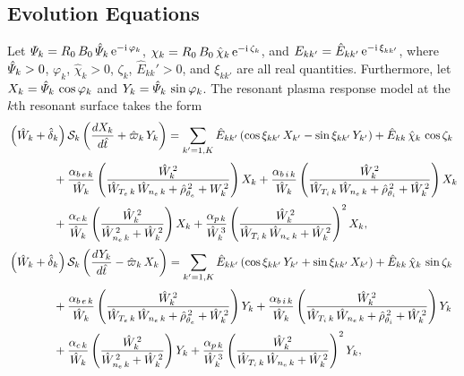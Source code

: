 \documentclass[notitlepage,12pt]{article}
\begin{document}
\subsection{Evolution Equations}
Let ${\mit\Psi}_k= R_0\,B_0\,\hat{\mit\Psi}_k\,{\rm e}^{-{\rm i}\,\varphi_k}$, ${\mit\chi}_k= R_0\,B_0\,\hat{\chi}_k\,{\rm e}^{-{\rm i}\,\zeta_k}$, and $E_{kk'}=\hat{E}_{kk'}\,{\rm e}^{-{\rm i}\,\xi_{kk'}}$,
where $\hat{\mit\Psi}_k>0$, $\varphi_k$, $\hat{\chi}_k>0$, $\zeta_k$, $\hat{E}_{kk}'>0$, and $\xi_{kk'}$ are all real quantities. Furthermore,
let $X_k= \hat{\mit\Psi}_k\,\cos\varphi_k$ and $Y_k= \hat{\mit\Psi}_k\,\sin\varphi_k$. The resonant plasma response model at the 
$k$th resonant surface takes the form
\begin{align}\label{e21}
&\left(\hat{W}_k +\hat{\delta}_k\right){\cal S}_k\left(\frac{dX_k}{d\hat{t}} 
+\hat{\varpi}_k\,Y_k\right)= \sum_{k'=1,K}\hat{E}_{kk'}\,(\cos\xi_{kk'}\,X_{k'}  -\sin\xi_{kk'}\,Y_{k'}) + \hat{E}_{kk}\,\hat{\chi}_k\,\cos\zeta_k\nonumber\\[0.5ex]&\phantom{=====} +\frac{\alpha_{b\,e\,k}}{\hat{W}_k}\left(\frac{\hat{W}_k^{\,2}}{\hat{W}_{T_{e}\,k}\,\hat{W}_{n_e\,k}+\hat{\rho}_{\theta_e}^{\,2}+W_k^{\,2}}\right)X_k+\frac{\alpha_{b\,i\,k}}{\hat{W}_k}\left(\frac{\hat{W}_k^{\,2}}{\hat{W}_{T_{i}\,k}\,\hat{W}_{n_e\,k}+\hat{\rho}_{\theta_i}^{\,2}+\hat{W}_k^{\,2}}\right)X_k\nonumber\\[0.5ex]
&\phantom{=====}+\frac{\alpha_{c\,k}}{\hat{W}_k}\left(\frac{\hat{W}_k^{\,2}}{\hat{W}_{n_e\,k}^{\,2}+\hat{W}_k^{\,2}}\right)X_k+\frac{\alpha_{p\,k}}{\hat{W}_k^{\,3}}\left(\frac{\hat{W}_k^{\,2}}{\hat{W}_{T_{i}\,k}\,\hat{W}_{n_e\,k}+\hat{W}_k^{\,2}}\right)^2 X_k,\\[0.5ex]
&\left(\hat{W}_k +\hat{\delta}_k\right){\cal S}_k\left(\frac{dY_k}{d\hat{t}} -\hat{\varpi}_k\,X_k\right)
= \sum_{k'=1,K}\hat{E}_{kk'}\,(\cos\xi_{kk'}\,Y_{k'}
+\sin\xi_{kk'}\,X_{k'}) + \hat{E}_{kk}\,\hat{\chi}_k\,\sin\zeta_k\nonumber\\[0.5ex]&\phantom{=====} +\frac{\alpha_{b\,e\,k}}{\hat{W}_k}\left(\frac{\hat{W}_k^{\,2}}{\hat{W}_{T_{e}\,k}\,\hat{W}_{n_e\,k}+\hat{\rho}_{\theta_e}^{\,2}+\hat{W}_k^{\,2}}\right)Y_k+\frac{\alpha_{b\,i\,k}}{\hat{W}_k}\left(\frac{\hat{W}_k^{\,2}}{\hat{W}_{T_{i}\,k}\,\hat{W}_{n_e\,k}+\hat{\rho}_{\theta_i}^{\,2}+\hat{W}_k^{\,2}}\right)Y_k\nonumber\\[0.5ex]
&\phantom{=====}+\frac{\alpha_{c\,k}}{\hat{W}_k}\left(\frac{\hat{W}_k^{\,2}}{\hat{W}_{n_e\,k}^{\,2}+\hat{W}_k^{\,2}}\right)Y_k+\frac{\alpha_{p\,k}}{\hat{W}_k^{\,3}}\left(\frac{\hat{W}_k^{\,2}}{\hat{W}_{T_{i}\,k}\,\hat{W}_{n_e\,k}+\hat{W}_k^{\,2}}\right)^2 Y_k,\label{e22}
\end{align}
\end{document}
